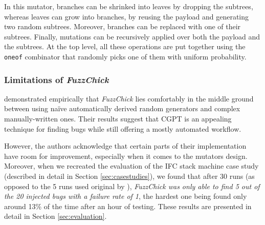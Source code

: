 \documentclass[acmsmall, anonymous]{acmart}
\newcommand{\fuzzchick}{\textit{FuzzChick}\xspace}
\begin{document}
In this mutator, branches can be shrinked into leaves by dropping the subtrees,
whereas leaves can grow into branches, by reusing the payload and generating two
random subtrees.
%
Moreover, branches can be replaced with one of their subtrees.
%
Finally, mutations can be recursively applied over both the payload and the
subtrees.
%
At the top level, all these operations are put together using the \texttt{oneof}
combinator that randomly picks one of them with uniform probability.

%
%
\subsubsection{Limitations of \fuzzchick}

\citeauthor{lampropoulos2019coverage} demonstrated empirically that \fuzzchick
lies comfortably in the middle ground between using na\"ive automatically
derived random generators and complex manually-written ones.
%
Their results suggest that CGPT is an appealing technique for finding bugs while
still offering a mostly automated workflow.

However, the authors acknowledge that certain parts of their implementation have
room for improvement, especially when it comes to the mutators design.
%
Moreover, when we recreated the evaluation of the IFC stack machine case study
(described in detail in Section \ref{sec:casestudies}), we found that after 30
runs (as opposed to the 5 runs used original by
\citeauthor{lampropoulos2019coverage}), \emph{\fuzzchick was only able to find 5
  out of the 20 injected bugs with a failure rate of 1}, the hardest one being
found only around 13\% of the time after an hour of testing.
%
These results are presented in detail in Section \ref{sec:evaluation}.
\end{document}
